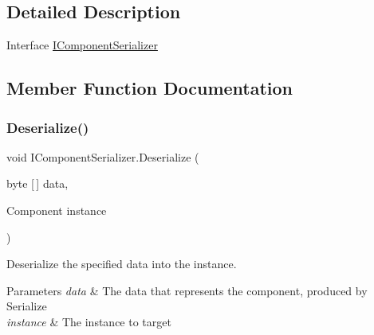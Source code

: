 \subsection{Detailed Description}
Interface \hyperlink{interface_i_component_serializer}{I\+Component\+Serializer} 



\subsection{Member Function Documentation}
\mbox{\label{interface_i_component_serializer_a4cc366a5c78b33d47a90c209d8fed883}} 
\subsubsection{\texorpdfstring{Deserialize()}{Deserialize()}}
{\footnotesize\ttfamily void I\+Component\+Serializer.\+Deserialize (\begin{DoxyParamCaption}\item[{byte \mbox{[}$\,$\mbox{]}}]{data,  }\item[{Component}]{instance }\end{DoxyParamCaption})}



Deserialize the specified data into the instance. 


\begin{DoxyParams}{Parameters}
{\em data} & The data that represents the component, produced by Serialize \\
\hline
{\em instance} & The instance to target \\
\hline
\end{DoxyParams}


